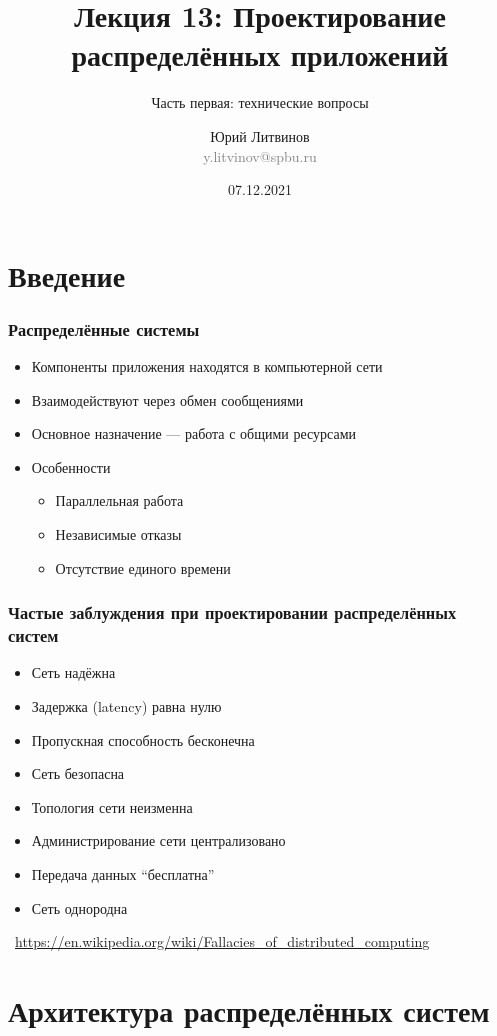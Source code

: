 \documentclass[xetex,mathserif,serif]{beamer}
\title[Проектирование распределённых приложений]{Лекция 13: Проектирование распределённых приложений}
\subtitle{Часть первая: технические вопросы}
\author[Юрий Литвинов]{Юрий Литвинов\\\small{\textcolor{gray}{y.litvinov@spbu.ru}}}
\date{07.12.2021}
\newcommand{\attribution}[1] {
    \vspace{-5mm}\begin{flushright}\begin{scriptsize}\textcolor{gray}{\textcopyright\, #1}\end{scriptsize}\end{flushright}
}
\begin{document}
    
    \frame{\titlepage}

    \section{Введение}

    \begin{frame}
        \frametitle{Распределённые системы}
        \begin{itemize}
            \item Компоненты приложения находятся в компьютерной сети
            \item Взаимодействуют через обмен сообщениями
            \item Основное назначение --- работа с общими ресурсами
            \item Особенности
            \begin{itemize}
                \item Параллельная работа
                \item Независимые отказы
                \item Отсутствие единого времени
            \end{itemize}
        \end{itemize}
    \end{frame}

    \begin{frame}
        \frametitle{Частые заблуждения при проектировании распределённых систем}
        \begin{itemize}
            \item Сеть надёжна
            \item Задержка (latency) равна нулю
            \item Пропускная способность бесконечна
            \item Сеть безопасна
            \item Топология сети неизменна
            \item Администрирование сети централизовано
            \item Передача данных ``бесплатна''
            \item Сеть однородна
        \end{itemize}
        \attribution{\url{https://en.wikipedia.org/wiki/Fallacies_of_distributed_computing}}
    \end{frame}

    \section{Архитектура распределённых систем}
\end{document}
